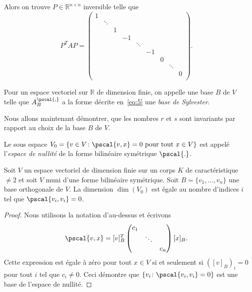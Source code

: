 Alors on trouve  $P ∈ ℝ^{n ×n}$ inversible telle que 
\begin{equation}
  \label{eq:5}
  P^T A P =
  \begin{pmatrix}
    1 &   \\
      & \ddots &  \\
      &        & 1 \\
      &        &  & -1 \\
      &        &  &    & \ddots \\
      &        &  &    &        & -1 \\
      &        &  &    &        &    & 0 \\
      &        &  &    &        &    &   & \ddots  \\
      &        &  &    &        &    &   &        & 0  \\

  \end{pmatrix}.
\end{equation}


\begin{definition}
  \label{def:37}
  Pour un espace vectoriel sur $ℝ$ de dimension finie, on appelle une base $B$ de $V$ telle que $A_B^{\pscal{,}}$ a la forme décrite en~\eqref{eq:5} une \emph{base de Sylvester}. 
\end{definition}

Nous allons maintenant démontrer, que les nombres $r$ et $s$ sont invariants par rapport au choix de la base $B$ de $V$. 


\begin{definition}
  \label{def:11}
  Le sous espace $V_0 = \{v \in V \colon \pscal{v,x} = 0 \text{ pour tout } x \in V\}$ est appelé l'\emph{espace de nullité} de la forme bilinéaire symétrique $\pscal{.}$. 
\end{definition}

\begin{theorem}
  \label{thr:9}
  Soit $V$
  un espace vectoriel de dimension finie sur un corps $K$
  de caractéristique $\neq 2$
  et soit $V$
  muni d'une forme bilinéaire symétrique. Soit $B = \{v_1,\dots,v_n\}$
  une base orthogonale de $V$.
  La dimension $\dim(V_0)$
  est égale au nombre d'indices $i$ tel que $\pscal{v_i,v_i}=0$.
\end{theorem}

\begin{proof}
  Nous utilisons la notation d'au-dessus et écrivons 
  \begin{displaymath}
    \pscal{v,x} =   [v]_B^T
                    \begin{pmatrix}
                      c_1 & & \\
                                     & \ddots & \\
                                     & & c_n
                    \end{pmatrix} [x]_B. 
  \end{displaymath}
Cette expression est égale à zéro pour tout $x ∈V$  si et seulement si $\left([v]_B\right)_i = 0$ pour tout $i$ tel que $c_i \neq 0$. Ceci démontre que $\{ v_i \colon \pscal{v_i,v_i}=0\}$ est une base de l'espace de nullité. 
\end{proof}

